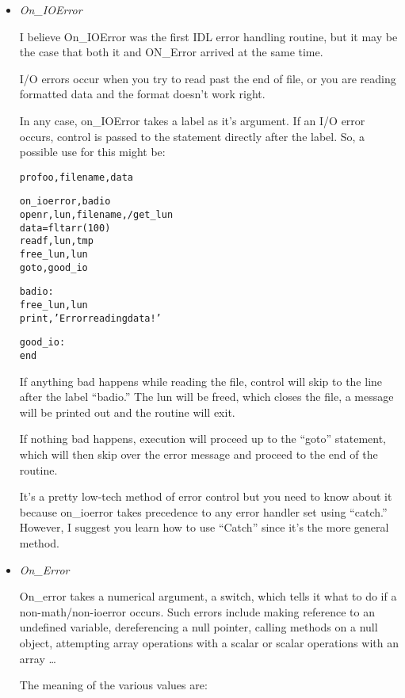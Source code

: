   \begin{itemize}
    \item \textit{On\_IOError}

    I believe On\_IOError was the first IDL error handling routine,
    but it may be the case that both it and ON\_Error arrived at the
    same time. 

    I/O errors occur when you try to read past the end of file, or you
    are reading formatted data and the format doesn't work right.

    In any case, on\_IOError takes a label as it's argument. If an
    I/O error occurs, control is passed to the statement directly
    after the label. So, a possible use for this might be:


\begin{alltt}
pro foo,filename,data

on_ioerror, badio
openr, lun, filename, /get_lun
data=fltarr(100)
readf,lun,tmp
free_lun,lun
goto, good_io

badio:
free_lun, lun
print,'Error reading data!'

good_io:
end
  
\end{alltt}


    If anything bad happens while reading the file, control will skip
    to the line after the label ``badio.'' The lun will be freed,
    which closes the file, a message will be printed out and the
    routine will exit.

    If nothing bad happens, execution will proceed up to the ``goto''
    statement, which will then skip over the error message and proceed
    to the end of the routine.

    It's a pretty low-tech method of error control but you need to
    know about it because on\_ioerror takes precedence to any error
    handler set using ``catch.'' However, I suggest you learn how to
    use ``Catch'' since it's the more general method.

    \item \textit{On\_Error}

    On\_error takes a numerical argument, a switch, which tells it
    what to do if a non-math/non-ioerror occurs. Such errors include
    making reference to an undefined variable, dereferencing a null
    pointer, calling methods on a null object, attempting array
    operations with a scalar or scalar operations with an array \ldots 

    The meaning of the various values are:


\end{itemize}
